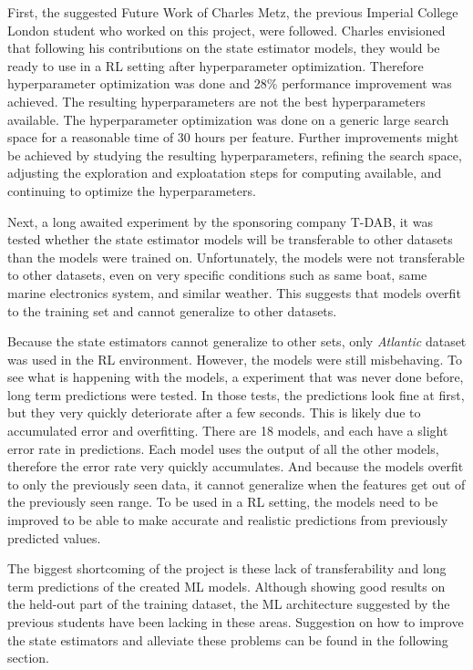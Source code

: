 \documentclass[12pt,twoside]{report}
\begin{document}
First, the suggested Future Work of Charles Metz, the previous Imperial College London student who worked on this project, were followed. Charles envisioned that following his contributions on the state estimator models, they would be ready to use in a RL setting after hyperparameter optimization. Therefore hyperparameter optimization was done and 28\% performance improvement was achieved. The resulting hyperparameters are not the best hyperparameters available. The hyperparameter optimization was done on a generic large search space for a reasonable time of 30 hours per feature. Further improvements might be achieved by studying the resulting hyperparameters, refining the search space, adjusting the exploration and exploatation steps for computing available, and continuing to optimize the hyperparameters.

Next, a long awaited experiment by the sponsoring company T-DAB, it was tested whether the state estimator models will be transferable to other datasets than the models were trained on. Unfortunately, the models were not transferable to other datasets, even on very specific conditions such as same boat, same marine electronics system, and similar weather. This suggests that models overfit to the training set and cannot generalize to other datasets. 

Because the state estimators cannot generalize to other sets, only \textit{Atlantic} dataset was used in the RL environment. However, the models were still misbehaving. 
To see what is happening with the models, a experiment that was never done before, long term predictions were tested. In those tests, the predictions look fine at first, but they very quickly deteriorate after a few seconds. This is likely due to accumulated error and overfitting. There are 18 models, and each have a slight error rate in predictions. Each model uses the output of all the other models, therefore the error rate very quickly accumulates. And because the models overfit to only the previously seen data, it cannot generalize when the features get out of the previously seen range. To be used in a RL setting, the models need to be improved to be able to make accurate and realistic predictions from previously predicted values.

The biggest shortcoming of the project is these lack of transferability and long term predictions of the created ML models. Although showing good results on the held-out part of the training dataset, the ML architecture suggested by the previous students have been lacking in these areas. Suggestion on how to improve the state estimators and alleviate these problems can be found in the following  section.
\end{document}
